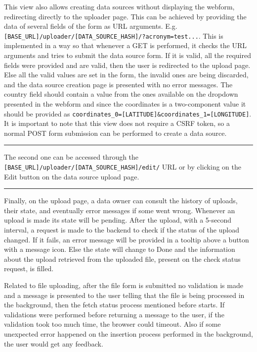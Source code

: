 \documentclass[
]{book}
\begin{document}
This view also allows creating data sources without displaying the webform, redirecting directly to the uploader page.
This can be achieved by providing the data of several fields of the form as URL arguments.
E.g. \texttt{{[}BASE\_URL{]}/uploader/{[}DATA\_SOURCE\_HASH{]}/?acronym=test...}.
This is implemented in a way so that whenever a GET is performed, it checks the URL arguments and tries to submit the data source form.
If it is valid, all the required fields were provided and are valid, then the user is redirected to the upload page.
Else all the valid values are set in the form, the invalid ones are being discarded, and the data source creation page is presented with no error messages.
The country field should contain a value from the ones available on the dropdown presented in the webform and since the coordinates is a two-component value it should be provided as \texttt{coordinates\_0={[}LATITUDE{]}\&coordinates\_1={[}LONGITUDE{]}}.
It is important to note that this view does not require a CSRF token, so a normal POST form submission can be performed to create a data source.

\begin{center}\rule{0.5\linewidth}{0.5pt}\end{center}

The second one can be accessed through the \texttt{{[}BASE\_URL{]}/uploader/{[}DATA\_SOURCE\_HASH{]}/edit/} URL or by clicking on the Edit button on the data source upload page.

\begin{center}\rule{0.5\linewidth}{0.5pt}\end{center}

Finally, on the upload page, a data owner can consult the history of uploads, their state, and eventually error messages if some went wrong.
Whenever an upload is made its state will be pending.
After the upload, with a 5-second interval, a request is made to the backend to check if the status of the upload changed.
If it fails, an error message will be provided in a tooltip above a button with a message icon.
Else the state will change to Done and the information about the upload retrieved from the uploaded file, present on the check status request, is filled.

Related to file uploading, after the file form is submitted no validation is made and a message is presented to the user telling that the file is being processed in the background, then the fetch status process mentioned before starts.
If validations were performed before returning a message to the user, if the validation took too much time, the browser could timeout.
Also if some unexpected error happened on the insertion process performed in the background, the user would get any feedback.
\end{document}
